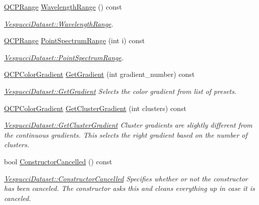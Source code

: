 \begin{DoxyCompactItemize}
\hyperlink{class_q_c_p_range}{Q\+C\+P\+Range} \hyperlink{class_vespucci_dataset_aaaa55c019d600aaaf1e3d32f61fbcbe9}{Wavelength\+Range} () const 
\begin{DoxyCompactList}\small\item\em \hyperlink{class_vespucci_dataset_aaaa55c019d600aaaf1e3d32f61fbcbe9}{Vespucci\+Dataset\+::\+Wavelength\+Range}. \end{DoxyCompactList}\item 
\hyperlink{class_q_c_p_range}{Q\+C\+P\+Range} \hyperlink{class_vespucci_dataset_a846ae60e4eac23547ff3b2c80c865159}{Point\+Spectrum\+Range} (int i) const 
\begin{DoxyCompactList}\small\item\em \hyperlink{class_vespucci_dataset_a846ae60e4eac23547ff3b2c80c865159}{Vespucci\+Dataset\+::\+Point\+Spectrum\+Range}. \end{DoxyCompactList}\item 
\hyperlink{class_q_c_p_color_gradient}{Q\+C\+P\+Color\+Gradient} \hyperlink{class_vespucci_dataset_a54bfebc97476ef4f0b612ed01cba0e10}{Get\+Gradient} (int gradient\+\_\+number) const 
\begin{DoxyCompactList}\small\item\em \hyperlink{class_vespucci_dataset_a54bfebc97476ef4f0b612ed01cba0e10}{Vespucci\+Dataset\+::\+Get\+Gradient} Selects the color gradient from list of presets. \end{DoxyCompactList}\item 
\hyperlink{class_q_c_p_color_gradient}{Q\+C\+P\+Color\+Gradient} \hyperlink{class_vespucci_dataset_aae952972c45fac62667e4cf6815d5249}{Get\+Cluster\+Gradient} (int clusters) const 
\begin{DoxyCompactList}\small\item\em \hyperlink{class_vespucci_dataset_aae952972c45fac62667e4cf6815d5249}{Vespucci\+Dataset\+::\+Get\+Cluster\+Gradient} Cluster gradients are slightly different from the continuous gradients. This selects the right gradient based on the number of clusters. \end{DoxyCompactList}\item 
bool \hyperlink{class_vespucci_dataset_a3a85c50b7952eb560cafbc2e57267ceb}{Constructor\+Cancelled} () const 
\begin{DoxyCompactList}\small\item\em \hyperlink{class_vespucci_dataset_a3a85c50b7952eb560cafbc2e57267ceb}{Vespucci\+Dataset\+::\+Constructor\+Cancelled} Specifies whether or not the constructor has been canceled. The constructor asks this and cleans everything up in case it is canceled. \end{DoxyCompactList}\item 

\end{DoxyCompactItemize}
